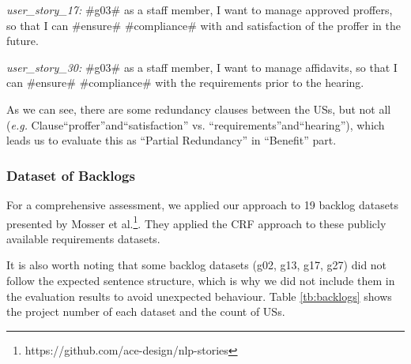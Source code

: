 \begin{itemize}
\begin{example}
	\textit{user\_story\_17:} \#g03\# as a staff member, I want to manage approved proffers, so that I can \#ensure\# \#compliance\# with and satisfaction of the proffer in the future.
	
	\textit{user\_story\_30:} \#g03\# as a staff member, I want to manage affidavits, so that I can \#ensure\# \#compliance\# with the requirements prior to the hearing.
	
	As we can see, there are some redundancy clauses between the USs, but not all (\textit{e.g.} Clause\enquote{proffer}and\enquote{satisfaction} vs. \enquote{requirements}and\enquote{hearing}), which leads us to evaluate this as \enquote{Partial Redundancy} in \enquote{Benefit} part.
	\end{example} 
	
\end{itemize}
\subsubsection*{Dataset of Backlogs}
For a comprehensive assessment, we applied our approach to 19 backlog datasets presented by Mosser et al.\footnote{https://github.com/ace-design/nlp-stories}. They applied the CRF approach to these publicly available requirements datasets\cite{requirementsdatasets}.

It is also worth noting that some backlog datasets (g02, g13, g17, g27) did not follow the expected sentence structure, which is why we did not include them in the evaluation results to avoid unexpected behaviour. Table \ref{tb:backlogs} shows the project number of each dataset and the count of USs.

